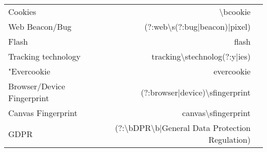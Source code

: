 \begin{table*}[t]
{\begin{tabular}{lrr}
Cookies                    & \textbackslash{}bcookie                                                                                                                                     &                                                                                                                         \\
Web Beacon/Bug             & (?:web\textbackslash{}s(?:bug|beacon)|pixel)                                                                                                                &                                                                                                                         \\
Flash                      & flash                                                                                                                                                       &                                                                                                                         \\
Tracking technology        & tracking\textbackslash{}stechnolog(?:y|ies)                                                                                                                 &                                                                                                                         \\
"Evercookie                & evercookie                                                                                                                                                  &                                                                                                                         \\
Browser/Device Fingerprint & (?:browser|device)\textbackslash{}sfingerprint                                                                                                              &                                                                                                                         \\
Canvas Fingerprint         & canvas\textbackslash{}sfingerprint                                                                                                                          &                                                                                                                         \\
GDPR                       & (?:\textbackslash{}bDPR\textbackslash{}b|General Data Protection Regulation)                                                                                &                                                                                                                         \\

\end{tabular}}
\end{table*}
